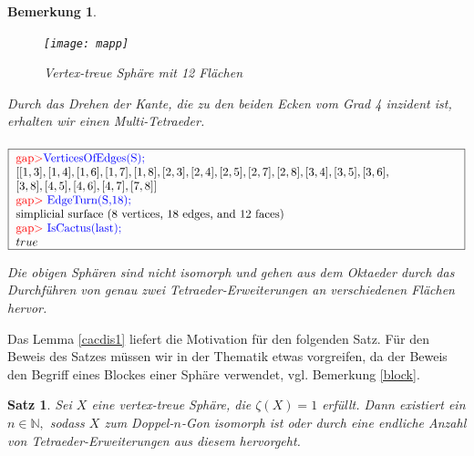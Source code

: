 \documentclass[12pt,titlepage,twoside,cleardoublepage]{article}
\theoremstyle{nummermitklammern}
\newtheorem{bemerkung}[temp]{Bemerkung}
\newtheorem{satz}[temp]{Satz}
\newtheorem{bemerkung}[zahl]{Bemerkung}
\newtheorem{satz}[zahl]{Satz}
\numberwithin{equation}{section}
\begin{document}
\begin{bemerkung}
\begin{itemize}
\begin{figure}[H]
\begin{center}
\texttt{[image: mapp]}
\end{center}
\caption{Vertex-treue Sphäre mit 12 Flächen}
\end{figure}
Durch das Drehen der Kante, die zu den beiden Ecken vom Grad 4 inzident ist, erhalten wir einen Multi-Tetraeder.\\\\
$\fbox{
\parbox{13.4cm}{
\textcolor{red}{gap$>$}\textcolor{blue}{ VerticesOfEdges(S);}\newline
$[ [ 1, 3 ], [ 1, 4 ], [ 1, 6 ], [ 1, 7 ], [ 1, 8 ], [ 2, 3 ], [ 2, 4 ], [ 2, 5 ], [ 2, 7 ], [ 2, 8 ], [ 3, 4 ], [ 3, 5 ], [ 3, 6 ], \newline
 [ 3, 8 ],
  [ 4, 5 ], [ 4, 6 ], [ 4, 7 ], [ 7, 8 ] ]$\newline
\textcolor{red}{gap$>$} \textcolor{blue}{EdgeTurn(S,18);}\newline
simplicial surface (8 vertices, 18 edges, and 12 faces)\newline
\textcolor{red}{gap$>$} \textcolor{blue}{IsCactus(last);}\newline
$true$
}}$
\end{itemize}
Die obigen Sphären sind nicht isomorph und gehen aus dem Oktaeder durch das Durchführen von genau zwei Tetraeder-Erweiterungen an verschiedenen Flächen hervor.  
\end{bemerkung}
Das Lemma \ref{cacdis1} liefert die Motivation für den folgenden Satz. Für den Beweis des Satzes müssen wir in der Thematik etwas vorgreifen, da der Beweis den Begriff eines Blockes einer Sphäre verwendet, vgl. Bemerkung \ref{block}.
\begin{satz}
Sei $X$ eine vertex-treue Sphäre, die $\zeta(X)=1$ erfüllt. Dann existiert ein $n\in \mathbb{N}, $ sodass $X$ zum Doppel-$n$-Gon isomorph ist oder durch eine endliche Anzahl von Tetraeder-Erweiterungen aus diesem hervorgeht.
 \end{satz}
\end{document}
